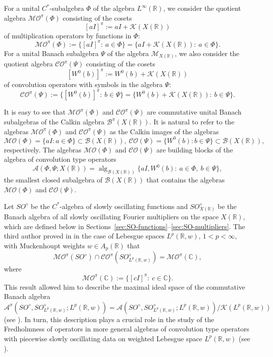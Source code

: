 \documentclass{birkjour}
\numberwithin{equation}{section}
\newcommand{\C}{\mathbb{C}}
\newcommand{\R}{\mathbb{R}}
\newcommand{\cA}{\mathcal{A}}
\newcommand{\cB}{\mathcal{B}}
\newcommand{\cK}{\mathcal{K}}
\newcommand{\cM}{\mathcal{M}}
\newcommand{\alg}{\operatorname{alg}}
\begin{document}
For a unital $C^*$-subalgeb\-ra $\Phi$ of the algebra $L^\infty(\R)$, we
consider the quotient algebra $\mathcal{MO}^\pi(\Phi)$ consisting of the
cosets
\[
[aI]^\pi:=aI+\cK(X(\R))
\]
of multiplication operators by functions in $\Phi$:
\[
\mathcal{MO}^\pi(\Phi)
:=
\{[aI]^\pi: \ a\in\Phi\}
=
\{aI+\cK(X(\R)):\ a\in\Phi\}.
\]
For a unital Banach subalgebra $\Psi$ of the algebra $\cM_{X(\R)}$, we also
consider the  quotient algebra $\mathcal{CO}^\pi(\Psi)$ consisting of the
cosets
\[
[W^0(b)]^\pi:=W^0(b)+\cK(X(\R))
\]
of convolution operators with symbols
in the algebra $\Psi$:
\[
\mathcal{CO}^\pi(\Psi)
:=
\{[W^0(b)]^\pi: \ b\in\Psi\}
=
\{W^0(b)+\cK(X(\R)) :\ b\in\Psi\}.
\]

It is easy to see that $\mathcal{MO}^\pi(\Phi)$ and
$\mathcal{CO}^\pi(\Psi)$ are commutative unital
Banach subalgebras of the Calkin algebra $\cB^\pi(X(\R))$.
It is natural to refer to the algebras $\mathcal{MO}^\pi(\Phi)$
and $\mathcal{CO}^\pi(\Psi)$ as the Calkin images of the algebras
\[
\mathcal{MO}(\Phi)=\{aI:a\in\Phi\}\subset\cB(X(\R)),
\
\mathcal{CO}(\Psi)=\{W^0(b):b\in\Psi\}\subset\cB(X(\R)),
\]
respectively. The algebras $\mathcal{MO}(\Phi)$ and
$\mathcal{CO}(\Psi)$ are building blocks of the algebra of convolution
type operators
\[
\cA(\Phi,\Psi;X(\R))=
\alg_{\cB(X(\R))}\big\{aI,W^0(b):\ a\in\Phi,\ b\in\Psi\big\},
\]
the smallest closed subalgebra of $\cB(X(\R))$ that contains the
algebras $\mathcal{MO}(\Phi)$ and $\mathcal{CO}(\Psi)$.

Let $SO^\diamond$ be the $C^*$-algebra of slowly oscillating functions
and $SO_{X(\R)}^\diamond$ be the Banach algebra of all slowly oscillating
Fourier multipliers on the space $X(\R)$, which are defined below in
Sections~\ref{sec:SO-functions}--\ref{sec:SO-multipliers}.
The third author proved in \cite[Lemma~4.3]{K17} in the case
of Lebesgue spaces $L^p(\R,w)$, $1<p<\infty$, with Muckenhoupt weights
$w\in A_p(\R)$ that
\begin{equation}\label{eq:old-equality}
\mathcal{MO}^\pi(SO^\diamond)\cap\mathcal{CO}^\pi(SO_{L^p(\R,w)}^\diamond)
=
\mathcal{MO}^\pi(\C),
\end{equation}
where
\begin{equation}\label{eq:multiplications-by-constants}
\mathcal{MO}^\pi(\C):=\{[cI]^\pi:\ c\in\C\}.
\end{equation}
This result allowed him to describe the maximal ideal space
of the commutative Banach algebra
\[
\cA^\pi(SO^\diamond,SO^\diamond_{L^p(\R,w)};L^p(\R,w))
=\cA(SO^\diamond,SO^\diamond_{L^p(\R,w)};L^p(\R,w))/\cK(L^p(\R,w))
\]
(see \cite[Theorem~3.1]{K17}). In turn, this description plays a crucial role
in the study of {the Fredholmness} of operators in more general algebras
of convolution type operators with piecewise slowly oscillating data
on weighted Lebesgue space $L^p(\R,w)$
(see \cite{K17,KILH12,KILH13a}).
\end{document}
